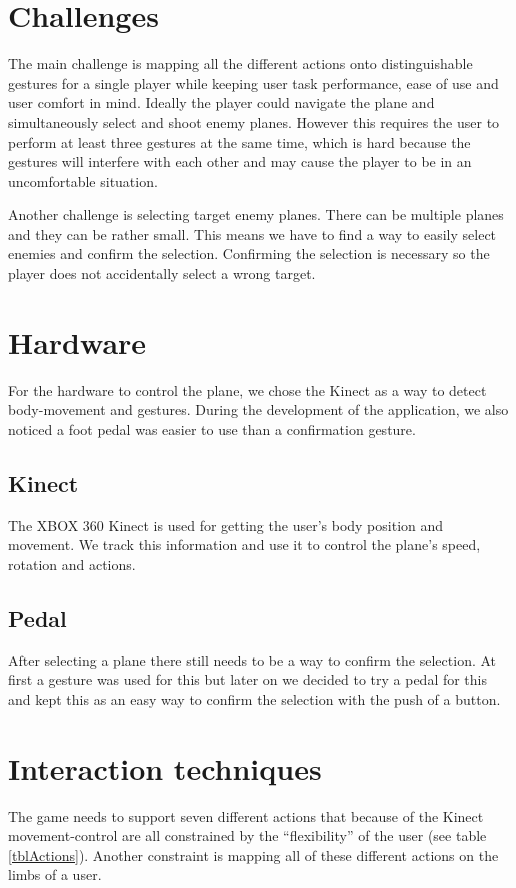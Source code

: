 \documentclass{acm_proc_article-sp}
\begin{document}
\section {Challenges}\label{sec:Challenges}
The main challenge is mapping all the different actions onto distinguishable gestures for a single player while keeping user task performance, ease of use and user comfort in mind. Ideally the player could navigate the plane and simultaneously select and shoot enemy planes. However this requires the user to perform at least three gestures at the same time, which is hard because the gestures will interfere with each other and may cause the player to be in an uncomfortable situation. 

Another challenge is selecting target enemy planes. There can be multiple planes and they can be rather small. This means we have to find a way to easily select enemies and confirm the selection. Confirming the selection is necessary so the player does not accidentally select a wrong target.

\section {Hardware}\label{sec:hardware}
For the hardware to control the plane, we chose the Kinect as a way to detect body-movement and gestures. During the development of the application, we also noticed a foot pedal was easier to use than a confirmation gesture.
\subsection{Kinect}
The XBOX 360 Kinect is used for getting the user's body position and movement. We track this information and use it to control the plane's speed, rotation and actions.

\subsection{Pedal}
After selecting a plane there still needs to be a way to confirm the selection. At first a gesture was used for this but later on we decided to try a pedal for this and kept this as an easy way to confirm the selection with the push of a button.

\section {Interaction techniques}\label{sec:Interactiontechniques}
The game needs to support seven different actions that because of the Kinect movement-control are all constrained by the ``flexibility'' of the user (see table \ref{tblActions}). Another constraint is mapping all of these different actions on the limbs of a user.
\end{document}
